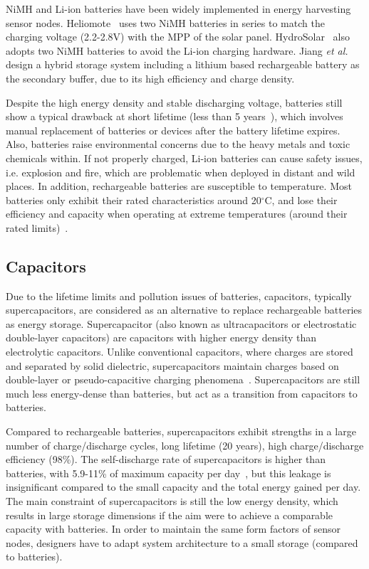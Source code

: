 NiMH and Li-ion batteries have been widely implemented in energy harvesting sensor nodes. Heliomote~\cite{raghunathan2005design} uses two NiMH batteries in series to match the charging voltage (2.2-2.8V) with the MPP of the solar panel. 
HydroSolar~\cite{taneja2008design} also adopts two NiMH batteries to avoid the Li-ion charging hardware. 
Jiang \textit{et al.}~\cite{jiang2005perpetual} design a hybrid storage system including a lithium based rechargeable battery as the secondary buffer, due to its high efficiency and charge density.

Despite the high energy density and stable discharging voltage, batteries still show a typical drawback at short lifetime (less than 5 years~\cite{simjee2008efficient}), which involves manual replacement of batteries or devices after the battery lifetime expires. 
Also, batteries raise environmental concerns due to the heavy metals and toxic chemicals within. 
If not properly charged, Li-ion batteries can cause safety issues, i.e. explosion and fire, which are problematic when deployed in distant and wild places. 
In addition, rechargeable batteries are susceptible to temperature. Most batteries only exhibit their rated characteristics around 20$^\circ$C, and lose their efficiency and capacity when operating at extreme temperatures (around their rated limits)~\cite{prauzek2018energy}. 


\subsection{Capacitors}

Due to the lifetime limits and pollution issues of batteries, capacitors, typically supercapacitors, are considered as an alternative to replace rechargeable batteries as energy storage. 
Supercapacitor (also known as ultracapacitors or electrostatic double-layer capacitors) are capacitors with higher energy density than electrolytic capacitors. 
Unlike conventional capacitors, where charges are stored and separated by solid dielectric, supercapacitors maintain charges based on double-layer or pseudo-capacitive charging phenomena~\cite{bueno2019nanoscale}. 
Supercapacitors are still much less energy-dense than batteries, but act as a transition from capacitors to batteries. 

Compared to rechargeable batteries, supercapacitors exhibit strengths in a large number of charge/discharge cycles, long lifetime (20 years), high charge/discharge efficiency (98\%). 
The self-discharge rate of supercapacitors is higher than batteries, with 5.9-11\% of maximum capacity per day~\cite{libich2018supercapacitors, renner2009lifetime}, but this leakage is insignificant compared to the small capacity and the total energy gained per day. 
The main constraint of supercapacitors is still the low energy density, which results in large storage dimensions if the aim were to achieve a comparable capacity with batteries. 
In order to maintain the same form factors of sensor nodes, designers have to adapt system architecture to a small storage (compared to batteries).

